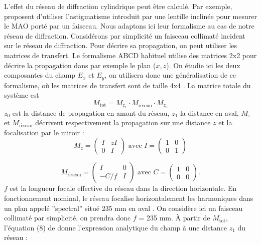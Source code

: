 L'effet du réseau de diffraction cylindrique peut être calculé. Par exemple,  proposent d'utiliser l'astigmatisme introduit par une lentille inclinée pour mesurer le MAO porté par un faisceau. Nous adaptons ici leur formalisme au cas de notre réseau de diffraction. Considérons par simplicité un faisceau collimaté incident sur le réseau de diffraction. Pour décrire sa propagation, on peut utiliser les matrices de transfert. Le formalisme ABCD habituel utilise des matrices 2x2 pour décrire la propagation dans par exemple le plan ($x,z$). On étudie ici les deux composantes du champ $E_x$ et $E_y$, on utilisera donc une généralisation de ce formalisme, où les matrices de transfert sont de taille 4x4 . La matrice totale du système est
\begin{equation*}
M_{\mathrm{tot}} = M_{z_1}\cdot M_{\mathrm{r\acute{e}seau}}\cdot M_{z_0}
\end{equation*}
$z_0$ est la distance de propagation en amont du réseau, $z_1$ la distance en aval, $M_z$ et $M_{\mathrm{r\acute{e}seau}}$ décrivent respectivement la propagation sur une distance $z$ et la focalisation par le miroir :
\begin{equation*}
M_z = \left(
\begin{array}{cc}
	I & zI \\
	0 & I
\end{array} \right)\text{ avec } 
I = \left(
\begin{array}{cc}
	1 & 0 \\
	0 & 1
\end{array} \right)
\end{equation*}


\begin{equation*}
M_{\mathrm{r\acute{e}seau}} = \left(
\begin{array}{cc}
	I & 0 \\
	-C/f & I
\end{array} \right)\text{ avec } 
C = \left(
\begin{array}{cc}
	1 & 0 \\
	0 & 0
\end{array} \right).
\end{equation*}
$f$ est la longueur focale effective du réseau dans la direction horizontale. En fonctionnement nominal, le réseau focalise horizontalement les harmoniques dans un plan appelé ''spectral'' situé 235 mm en aval . On considère ici un faisceau collimaté par simplicité, on prendra donc $f$ = 235 mm.
\`{A} partir de $M_{\mathrm{tot}}$, l'équation (8) de  donne l'expression analytique du champ à une distance $z_1$ du réseau :

